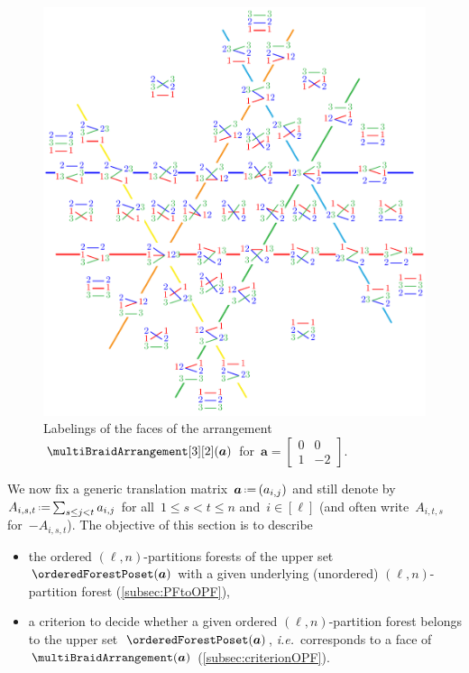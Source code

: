 \documentclass{amsart}
\theoremstyle{definition}
\renewcommand{\b}[1]{{\boldsymbol{#1}}} %
\newcommand{\eqdef}{\mbox{\,\raisebox{0.2ex}{\scriptsize\ensuremath{\mathrm:}}\ensuremath{=}\,}} %
\newcommand{\ie}{\textit{i.e.}~} %
\renewcommand{\b}[1]{\boldsymbol{#1}} %
\begin{document}
\begin{figure}
	\centerline{\includegraphics[scale=.9]{B23b}}
	\caption{Labelings of the faces of the arrangement~$\multiBraidArrangement[3][2](\b{a})$ for~$\b{a} = \begin{bmatrix} 0 & 0 \\ 1 & -2 \end{bmatrix}$.}
	\label{fig:B23b}
\end{figure}

We now fix a generic translation matrix~$\b{a} \eqdef (a_{i,j})$ and still denote by~$A_{i,s,t} \eqdef \smash{\sum_{s \le j < t} a_{i,j}}$ for all~$1 \le s < t \le n$ and~$i \in [\ell]$ (and often write~$A_{i,t,s}$ for~$-A_{i,s,t}$).
The objective of this section is to describe
\begin{itemize}
\item the ordered $(\ell,n)$-partitions forests of the upper set~$\orderedForestPoset(\b{a})$ with a given underlying (unordered) $(\ell,n)$-partition forest (\cref{subsec:PFtoOPF}),
\item a criterion to decide whether a given ordered $(\ell,n)$-partition forest belongs to the upper set~$\orderedForestPoset(\b{a})$, \ie corresponds to a face of~$\multiBraidArrangement(\b{a})$ (\cref{subsec:criterionOPF}).
\end{itemize}
\end{document}
